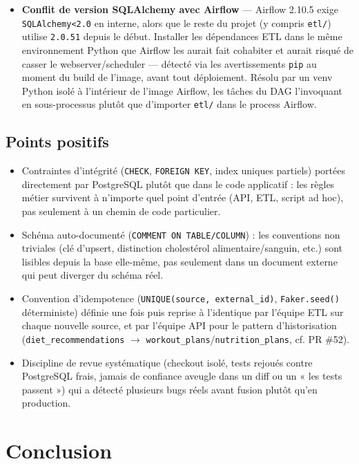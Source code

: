 \documentclass{article}
\begin{document}
\begin{itemize}[leftmargin=1.4em]
  \item \textbf{Conflit de version SQLAlchemy avec Airflow} — Airflow 2.10.5 exige \texttt{SQLAlchemy<2.0} en interne, alors que le reste du projet (y compris \texttt{etl/}) utilise \texttt{2.0.51} depuis le début. Installer les dépendances ETL dans le même environnement Python que Airflow les aurait fait cohabiter et aurait risqué de casser le webserver/scheduler — détecté via les avertissements \texttt{pip} au moment du build de l'image, avant tout déploiement. Résolu par un venv Python isolé à l'intérieur de l'image Airflow, les tâches du DAG l'invoquant en sous-processus plutôt que d'importer \texttt{etl/} dans le process Airflow.
\end{itemize}

\subsection{Points positifs}

\begin{itemize}[leftmargin=1.4em]
  \item Contraintes d'intégrité (\texttt{CHECK}, \texttt{FOREIGN KEY}, index uniques partiels) portées directement par PostgreSQL plutôt que dans le code applicatif : les règles métier survivent à n'importe quel point d'entrée (API, ETL, script ad hoc), pas seulement à un chemin de code particulier.
  \item Schéma auto-documenté (\texttt{COMMENT ON TABLE/COLUMN}) : les conventions non triviales (clé d'upsert, distinction cholestérol alimentaire/sanguin, etc.) sont lisibles depuis la base elle-même, pas seulement dans un document externe qui peut diverger du schéma réel.
  \item Convention d'idempotence (\texttt{UNIQUE(source, external\_id)}, \texttt{Faker.seed()} déterministe) définie une fois puis reprise à l'identique par l'équipe ETL sur chaque nouvelle source, et par l'équipe API pour le pattern d'historisation (\texttt{diet\_recommendations} $\rightarrow$ \texttt{workout\_plans}/\texttt{nutrition\_plans}, cf. PR \#52).
  \item Discipline de revue systématique (checkout isolé, tests rejoués contre PostgreSQL frais, jamais de confiance aveugle dans un diff ou un « les tests passent ») qui a détecté plusieurs bugs réels avant fusion plutôt qu'en production.
\end{itemize}

\section{Conclusion}
\end{document}
